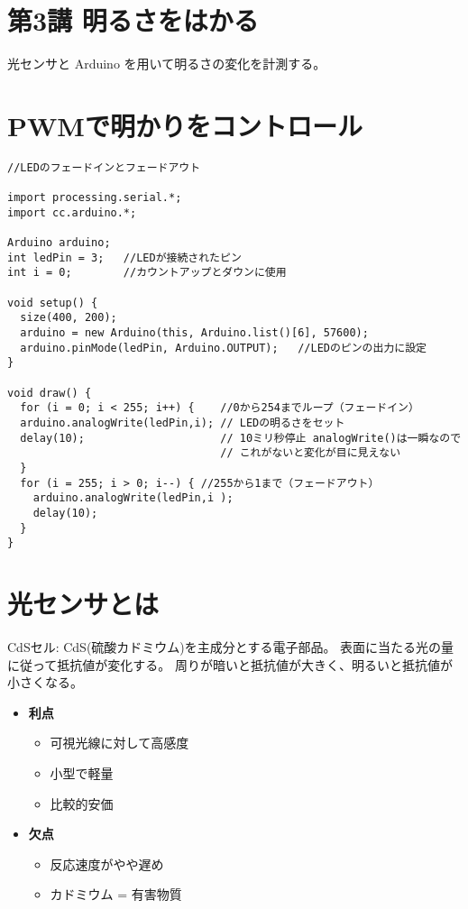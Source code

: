 \documentclass[11pt,a4paper]{jarticle}
\begin{document}
\section*{\LARGE{第3講 明るさをはかる}}
光センサと Arduino を用いて明るさの変化を計測する。

\section{PWMで明かりをコントロール}
\begin{lstlisting}
//LEDのフェードインとフェードアウト

import processing.serial.*;
import cc.arduino.*;
 
Arduino arduino;
int ledPin = 3;   //LEDが接続されたピン
int i = 0;        //カウントアップとダウンに使用
 
void setup() {
  size(400, 200);
  arduino = new Arduino(this, Arduino.list()[6], 57600);
  arduino.pinMode(ledPin, Arduino.OUTPUT);   //LEDのピンの出力に設定
}

void draw() {
  for (i = 0; i < 255; i++) {    //0から254までループ（フェードイン）
  arduino.analogWrite(ledPin,i); // LEDの明るさをセット
  delay(10);                     // 10ミリ秒停止 analogWrite()は一瞬なので
                                 // これがないと変化が目に見えない  
  }
  for (i = 255; i > 0; i--) { //255から1まで（フェードアウト）
    arduino.analogWrite(ledPin,i );
    delay(10);
  }
}
\end{lstlisting}

\section{光センサとは}
CdSセル: CdS(硫酸カドミウム)を主成分とする電子部品。
表面に当たる光の量に従って抵抗値が変化する。
周りが暗いと抵抗値が大きく、明るいと抵抗値が小さくなる。

\begin{itemize}
 \item \textbf{利点}
       \begin{itemize}
	\item 可視光線に対して高感度
	\item 小型で軽量
	\item 比較的安価
       \end{itemize}
 \item \textbf{欠点}
       \begin{itemize}
	\item 反応速度がやや遅め
	\item カドミウム = 有害物質
       \end{itemize}
\end{itemize}
\end{document}
